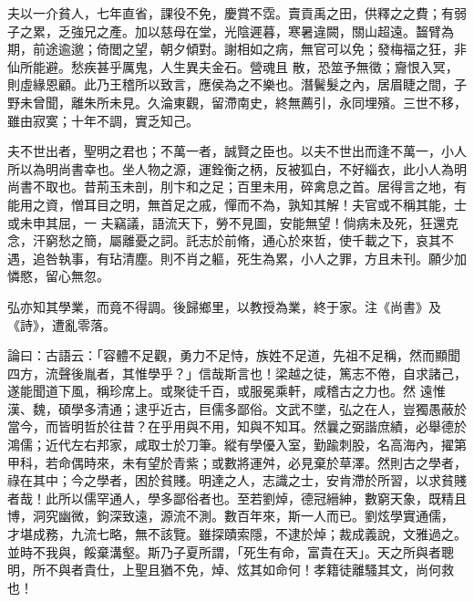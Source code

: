 \begin{pinyinscope}
 夫以一介貧人，七年直省，課役不免，慶賞不霑。賣貢禹之田，供釋之之費；有弱子之累，乏強兄之產。加以慈母在堂，光陰遲暮，寒暑違闕，關山超遠。齧臂為期，前途逾邈；倚閭之望，朝夕傾對。謝相如之病，無官可以免；發梅福之狂，非仙所能避。愁疾甚乎厲鬼，人生異夫金石。營魂且
 散，恐筮予無徵；齎恨入冥，則虛緣恩顧。此乃王稽所以致言，應侯為之不樂也。潛鬢髮之內，居眉睫之間，子野未曾聞，離朱所未見。久淪東觀，留滯南史，終無薦引，永同埋殯。三世不移，雖由寂寞；十年不調，實乏知己。



 夫不世出者，聖明之君也；不萬一者，誠賢之臣也。以夫不世出而逢不萬一，小人所以為明尚書幸也。坐人物之源，運銓衡之柄，反被狐白，不好緇衣，此小人為明尚書不取也。昔荊玉未剖，刖卞和之足；百里未用，碎禽息之首。居得言之地，有能用之資，憎耳目之明，無首足之戚，憚而不為，孰知其解！夫官或不稱其能，士或未申其屈，一
 夫竊議，語流天下，勞不見圖，安能無望！倘病未及死，狂還克念，汗窮愁之簡，屬離憂之詞。託志於前脩，通心於來哲，使千載之下，哀其不遇，追咎執事，有玷清塵。則不肖之軀，死生為累，小人之罪，方且未刊。願少加憐愍，留心無忽。



 弘亦知其學業，而竟不得調。後歸鄉里，以教授為業，終于家。注《尚書》及《詩》，遭亂零落。



 論曰：古語云：「容體不足觀，勇力不足恃，族姓不足道，先祖不足稱，然而顯聞四方，流聲後胤者，其惟學乎？」信哉斯言也！梁越之徒，篤志不倦，自求諸己，遂能聞道下風，稱珍席上。或聚徒千百，或服冕乘軒，咸稽古之力也。然
 遠惟漢、魏，碩學多清通；逮乎近古，巨儒多鄙俗。文武不墜，弘之在人，豈獨愚蔽於當今，而皆明哲於往昔？在乎用與不用，知與不知耳。然曩之弼諧庶績，必舉德於鴻儒；近代左右邦家，咸取士於刀筆。縱有學優入室，勤踰刺股，名高海內，擢第甲科，若命偶時來，未有望於青紫；或數將運舛，必見棄於草澤。然則古之學者，祿在其中；今之學者，困於貧賤。明達之人，志識之士，安肯滯於所習，以求貧賤者哉！此所以儒罕通人，學多鄙俗者也。至若劉焯，德冠縉紳，數窮天象，既精且博，洞究幽微，鉤深致遠，源流不測。數百年來，斯一人而已。劉炫學實通儒，
 才堪成務，九流七略，無不該覽。雖探賾索隱，不逮於焯；裁成義說，文雅過之。並時不我與，餒棄溝壑。斯乃子夏所謂，「死生有命，富貴在天」。天之所與者聰明，所不與者貴仕，上聖且猶不免，焯、炫其如命何！孝籍徒離騷其文，尚何救也！



\end{pinyinscope}